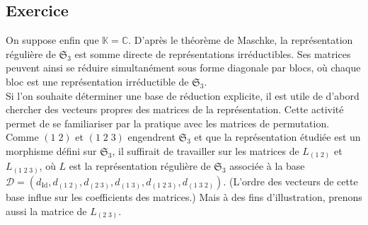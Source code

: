 \documentclass[10pt,a4paper,french,landscape]{article}
\theoremstyle{definition}
\theoremstyle{remark}
\DeclareMathOperator{\Id}{Id}
\newcommand{\CC}{\mathbb C}
\newcommand{\KK}{\mathbb K}
\newcommand{\Sy}{\mathfrak{S}}
\newcommand{\1}{\mathbbm{1}}
\newcommand{\Sn}[1][n]{\Sy_{#1}}
\newcommand{\ba}[1]{\mathcal{#1}}
\begin{document}
\begin{multicols*}{2}
\section{Exercice}

On suppose enfin que $\KK=\CC$. D'après le théorème de Maschke, la représentation régulière de $\Sn[3]$ est somme directe de représentations irréductibles. Ses matrices peuvent ainsi se réduire simultanément sous forme diagonale par blocs, où chaque bloc est une représentation irréductible de $\Sn[3]$.\\


Si l'on souhaite déterminer une base de réduction explicite, il est utile de d'abord chercher des vecteurs propres des matrices de la représentation. Cette activité permet de se familiariser par la pratique avec les matrices de permutation.\\

Comme $(1\; 2)$ et $(1\; 2\; 3)$ engendrent $\Sn[3]$ et que la représentation étudiée est un morphisme défini sur $\Sn[3]$, il suffirait de travailler sur les matrices de $L_{(1\; 2)}$ et $L_{(1\; 2\; 3)}$, où $L$ est la représentation régulière de $\Sn[3]$ associée à la base $\ba{D}=(d_{\Id},d_{(1\; 2)},d_{(2\; 3)},d_{(1\; 3)},d_{(1\; 2\; 3)},d_{(1\; 3\; 2)})$. (L'ordre des vecteurs de cette base influe sur les coefficients des matrices.) Mais à des fins d'illustration, prenons aussi la matrice de $L_{(2\; 3)}$.
\medskip


\end{multicols*}
\end{document}
